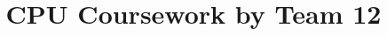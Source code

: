 \documentclass[a4paper, 11pt]{article}      %
\title{\LARGE \bf
CPU Coursework by Team 12
}
\begin{document}
\sloppy



\tableofcontents



\newpage

%

%

\end{document}
